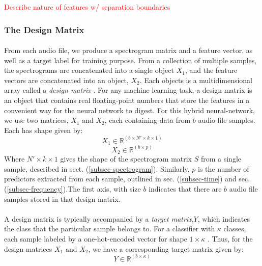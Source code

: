 \documentclass[12pt,letterpaper]{article}
\begin{document}
\textcolor{red}{Describe nature of features w/ separation boundaries}

\newpage


\subsubsection{The Design Matrix}

\paragraph*{}From each audio file, we produce a spectrogram matrix and a feature vector, as well as a target label for training purpose. From a collection of multiple samples, the spectrograms are concatenated into a single object $X_1$, and the feature vectors are concatenated into an object, $X_2$. Each objects is a multidimensional array called a \textit{design matrix} \cite{Geron,Goodfellow,Loy,Zerizel}. For any machine learning task, a  design matrix is an object that contains real floating-point numbers that store the features in a convenient way for the neural network to digest. For this hybrid neural-network, we use two matrices, $X_1$ and $X_2$, each containing data from $b$ audio file samples. Each has shape given by:
\begin{equation}
\label{eqn-X1Shape}
X_1 \in \mathbb{R}^{(b \times N' \times k \times 1)}
\end{equation}
\begin{equation}
\label{eqn-X2Shape}
X_2 \in \mathbb{R}^{(b \times p)}
\end{equation}
Where $N' \times k \times 1$ gives the shape of the spectrogram matrix $S$ from a single sample, described in sect. (\ref{subsec-spectrogram}). Similarly, $p$ is the number of predictors extracted from each sample, outlined in sec. (\ref{subsec-time}) and sec.(\ref{subsec-frequency}).The first axis, with size $b$ indicates that there are $b$ audio file samples stored in that design matrix. 

\paragraph*{}A design matrix is typically accompanied by a \textit{target matrix},$Y$, which indicates the class that the particular sample belongs to. For a classifier with $\kappa$ classes, each sample labeled by a one-hot-encoded vector for shape $1 \times \kappa$ \cite{Tensorflow}. Thus, for the design matrices $X_1$ and $X_2$, we have a corresponding target matrix given by:
\begin{equation}
\label{eqn-YShape}
Y \in \mathbb{R}^{(b \times \kappa)}
\end{equation}
\end{document}

